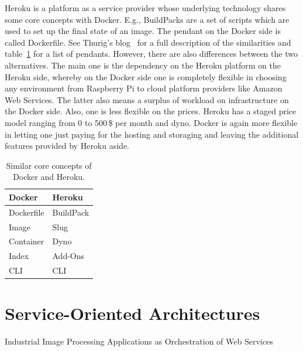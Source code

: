 Heroku is a platform as a service provider whose underlying technology shares some core concepts with Docker. E.g., BuildPacks are a set of scripts which are used to set up the final state of an image. The pendant on the Docker side is called Dockerfile. See Thurig's blog~\cite{Thurig2014Docker2018} for a full description of the similarities and table~\ref{dockerandheroku} for a list of pendants. However, there are also differences between the two alternatives. The main one is the dependency on the Heroku platform on the Heroku side, whereby on the Docker side one is completely flexible in choosing any environment from Raspberry Pi to cloud platform providers like Amazon Web Services. The latter also means a surplus of workload on infrastructure on the Docker side. Also, one is less flexible on the prices. Heroku has a staged price model ranging from 0 to 500\,\$ per month and dyno. Docker is again more flexible in letting one just paying for the hosting and storaging and leaving the additional features provided by Heroku aside.~\cite{Chris2017Why2018} 


\begin{table}
\begin{center}
      \caption[Similar core concepts of Docker and Heroku]{Similar core concepts of Docker and Heroku. \cite{Thurig2014Docker2018}}
  \begin{tabular}{ l | l }
    Docker & Heroku  \\ \hline
Dockerfile &	BuildPack \\ 
Image	& Slug\\ 
Container&	Dyno\\ 
Index	&Add-Ons\\ 
CLI	&CLI
  \end{tabular}
  \label{dockerandheroku}
\end{center}
\end{table}

\section{Service-Oriented Architectures}
Industrial Image Processing Applications as Orchestration of Web Services

